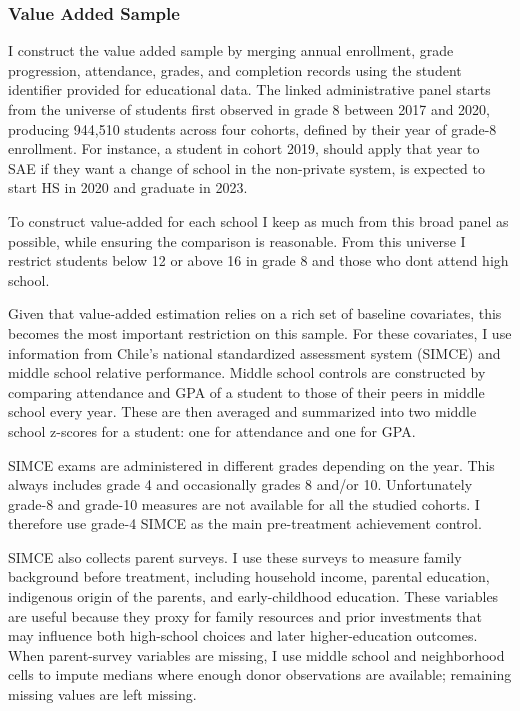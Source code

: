 \documentclass[a4paper, article, english, oneside, unknownkeysallowed, 12pt]{memoir}
\begin{document}
\subsubsection{Value Added Sample}

I construct the value added sample by merging annual enrollment, grade progression, attendance, grades, and completion records using the student identifier provided for educational data.
The linked administrative panel starts from the universe of students first observed in grade 8 between 2017 and 2020, producing 944,510 students across four cohorts, defined 
by their year of grade-8 enrollment. 
For instance, a student in cohort 2019, should apply that year to SAE if they want a change of school in the non-private system, is expected to start HS in 2020 and graduate in 2023.


To construct value-added for each school I keep as much from this broad panel as possible, while ensuring the comparison is reasonable.
From this universe I restrict students below 12 or above 16 in grade 8 and those who dont attend high school. 


Given that value-added estimation relies on a rich set of baseline covariates, this becomes the most important restriction on this sample.
For these covariates, I use information from Chile's national standardized assessment system (SIMCE) and middle school relative performance.
Middle school controls are constructed by comparing attendance and GPA of a student to those of their peers in middle school every year. 
These are then averaged and summarized into two middle school z-scores for a student: one for attendance and one for GPA.

SIMCE exams are administered in different grades depending on the year. 
This always includes grade 4 and occasionally grades 8 and/or 10.
Unfortunately grade-8 and grade-10 measures are not available for all the studied cohorts.
I therefore use grade-4 SIMCE as the main pre-treatment achievement control.

SIMCE also collects parent surveys.
I use these surveys to measure family background before treatment, including household income, parental education, indigenous origin of the parents, and early-childhood education.
These variables are useful because they proxy for family resources and prior investments that may influence both high-school choices and later higher-education outcomes.
When parent-survey variables are missing, I use middle school and neighborhood cells to impute medians where enough donor observations are available; remaining missing values are left missing.
\end{document}
